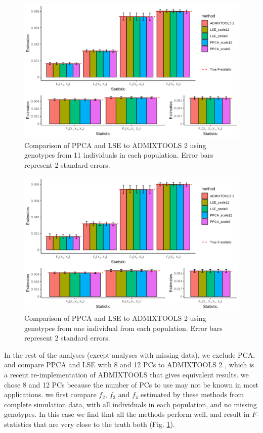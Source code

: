 \documentclass[12pt]{article}
\begin{document}
\begin{figure}[ht!]
    \includegraphics[width=16.5cm]{Images/ppca/Supplement/mu0.05_plot_all.png}
    \centering
    \caption{Comparison of PPCA and LSE to ADMIXTOOLS 2 using genotypes from 11 individuals in each population. Error bars represent 2 standard errors.}
    \label{figS5:comparison10}
\end{figure}

\begin{figure}[ht!]
    \includegraphics[width=16.5cm]{Images/ppca/Supplement/mu0.05_plot_all_1ind.png}
    \centering
    \caption{Comparison of PPCA and LSE to ADMIXTOOLS 2 using genotypes from one individual from each population. Error bars represent 2 standard errors.}
    \label{figS6:comparison1}
\end{figure}

In the rest of the analyses (except analyses with missing data), we exclude PCA, and compare PPCA and LSE with 8 and 12 PCs to ADMIXTOOLS 2 \citep{maier_limits_2022}, which is a recent re-implementation of ADMIXTOOLS \citep{patterson_ancient_2012} that gives equivalent results. we chose 8 and 12 PCs because the number of PCs to use may not be known in most applications. we first compare $f_2$, $f_3$ and $f_4$ estimated by these methods from complete simulation data, with all individuals in each population, and no missing genotypes. In this case we find that all the methods perform well, and result in $F$-statistics that are very close to the truth both (Fig. \ref{figS5:comparison10}). 
\end{document}
